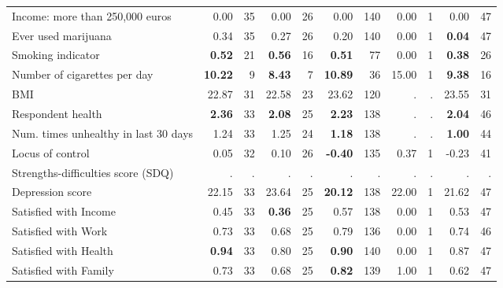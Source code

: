 \begin{tabular}{l r r r r r r r r r r}
Income: more than 250,000 euros &      0.00 &        35 &      0.00 &        26 &      0.00 &       140 &      0.00 &         1 &      0.00 &        47 \\
Ever used marijuana &      0.34 &        35 &      0.27 &        26 &      0.20 &       140 &      0.00 &         1 & \textbf{     0.04} &        47 \\
Smoking indicator & \textbf{     0.52} &        21 & \textbf{     0.56} &        16 & \textbf{     0.51} &        77 &      0.00 &         1 & \textbf{     0.38} &        26 \\
Number of cigarettes per day & \textbf{    10.22} &         9 & \textbf{     8.43} &         7 & \textbf{    10.89} &        36 &     15.00 &         1 & \textbf{     9.38} &        16 \\
BMI &     22.87 &        31 &     22.58 &        23 &     23.62 &       120 &         . & . &     23.55 &        31 \\
Respondent health & \textbf{     2.36} &        33 & \textbf{     2.08} &        25 & \textbf{     2.23} &       138 &         . & . & \textbf{     2.04} &        46 \\
Num. times unhealthy in last 30 days &      1.24 &        33 &      1.25 &        24 & \textbf{     1.18} &       138 &         . & . & \textbf{     1.00} &        44 \\
Locus of control &      0.05 &        32 &      0.10 &        26 & \textbf{    -0.40} &       135 &      0.37 &         1 &     -0.23 &        41 \\
Strengths-difficulties score (SDQ) &         . & . &         . & . &         . & . &         . & . &         . & . \\
Depression score &     22.15 &        33 &     23.64 &        25 & \textbf{    20.12} &       138 &     22.00 &         1 &     21.62 &        47 \\
Satisfied with Income &      0.45 &        33 & \textbf{     0.36} &        25 &      0.57 &       138 &      0.00 &         1 &      0.53 &        47 \\
Satisfied with Work &      0.73 &        33 &      0.68 &        25 &      0.79 &       136 &      0.00 &         1 &      0.74 &        46 \\
Satisfied with Health & \textbf{     0.94} &        33 &      0.80 &        25 & \textbf{     0.90} &       140 &      0.00 &         1 &      0.87 &        47 \\
Satisfied with Family &      0.73 &        33 &      0.68 &        25 & \textbf{     0.82} &       139 &      1.00 &         1 &      0.62 &        47 \\
\bottomrule
\end{tabular}
